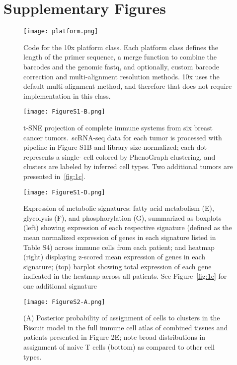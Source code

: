 
\chapter[Supplementary Figures][Supplementary Figures]{Supplementary Figures}

\begin{figure}
\centering
\texttt{[image: platform.png]}
\caption{Code for the 10x platform class. Each platform class defines the length of the primer sequence, a merge function to combine the barcodes and the genomic fastq, and optionally, custom barcode correction and multi-alignment resolution methods. 10x uses the default multi-alignment method, and therefore that does not require implementation in this class.}

\label{fig:10x_platform}
\end{figure}

\begin{figure}
\centering
\texttt{[image: FigureS1-B.png]}
\caption{t-SNE projection of complete immune systems from six breast cancer tumors.\ scRNA-seq data for each tumor is processed with pipeline in Figure S1B and library size-normalized; each dot represents a single- cell colored by PhenoGraph clustering, and clusters are labeled by inferred cell types. Two additional tumors are presented in~\ref{fig:1c}.
}
\label{fig:s1b}
\end{figure}

\begin{figure}
\centering
\texttt{[image: FigureS1-D.png]}
\caption{Expression of metabolic signatures: fatty acid metabolism (E), glycolysis (F), and phosphorylation (G), summarized as boxplots (left) showing expression of each respective signature (defined as the mean normalized expression of genes in each signature listed in Table S4) across immune cells from each patient; and heatmap (right) displaying z-scored mean expression of genes in each signature; (top) barplot showing total expression of each gene indicated in the heatmap across all patients. See Figure~\ref{fig:1e} for one additional signature
}
\label{fig:s1d}
\end{figure}

\begin{figure}
\centering
\texttt{[image: FigureS2-A.png]}
\caption{(A) Posterior probability of assignment of cells to clusters in the Biscuit model in the full immune cell atlas of combined tissues and patients presented in Figure 2E; note broad distributions in assignment of naive T cells (bottom) as compared to other cell types.
}
\label{fig:s2a}
\end{figure}

